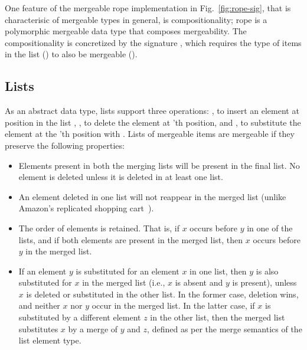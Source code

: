 One feature of the mergeable rope implementation in
Fig.~\ref{fig:rope-sig}, that is characterisic of mergeable types in
general, is compositionality; rope is a polymorphic mergeable data
type that composes mergeability. The compositionality is concretized
by the  signature , which requires the type of items in the
list () to also be mergeable ().

\subsection{Lists}



As an abstract data type, lists support three
operations: , to insert an element  at position
 in the list , , to delete the element at
'th position, and , to substitute the element at
the 'th position with .  Lists of mergeable items are
mergeable if they preserve the following properties:
\begin{itemize}
  \item Elements present in both the merging lists will be present in
  the final list. No element is deleted unless it is deleted in at
  least one list.
  \item An element deleted in one list will not reappear in the merged
  list (unlike Amazon's replicated shopping cart~\cite{Dynamo}).
  \item The order of elements is retained. That is, if $x$ occurs
  before $y$ in one of the lists, and if both elements are present in
  the merged list, then $x$ occurs before $y$ in the merged list.
\item If an element $y$ is substituted for an element $x$ in one list,
  then $y$ is also substituted for $x$ in the merged list (i.e., $x$
  is absent and $y$ is present), unless $x$ is deleted or substituted
  in the other list. In the former case, deletion wins, and neither
  $x$ nor $y$ occur in the merged list. In the latter case, if $x$ is
  substituted by a different element $z$ in the other list, then the
  merged list substitutes $x$ by a merge of $y$ and $z$, defined as
  per the merge semantics of the list element type.
\end{itemize}

